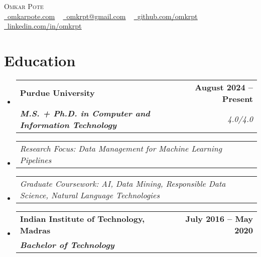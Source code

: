 \documentclass[letterpaper,11pt]{article}
\makeatletter
\newcommand{\resumeSubheading}[4]{
  \vspace{-2pt}\item
    \begin{tabular*}{1.0\textwidth}[t]{l@{\extracolsep{\fill}}r}
      \textbf{#1} & \textbf{\small #2} \\
      \textit{\small#3} & \textit{\small #4} \\
    \end{tabular*}\vspace{-7pt}
}
\newcommand{\resumeSubSubheading}[2]{
    \item
    \begin{tabular*}{1.0\textwidth}{l@{\extracolsep{\fill}}r}
      \textit{\small#1} & \textit{\small #2} \\
    \end{tabular*}\vspace{-7pt}
}
\newcommand{\resumeSubHeadingListStart}{\begin{itemize}[leftmargin=0.0in, label={}]}
\newcommand{\resumeSubHeadingListEnd}{\end{itemize}}
\makeatother
\begin{document}

\begin{center}
    {\vspace*{30pt} \Huge \scshape Omkar Pote} \\ \vspace{5pt} 
    \small
    \href{https://omkarpote.com}{\raisebox{-0.2\height}\faGlobe\  \underline{omkarpote.com}} ~ 
    \href{mailto:omkrpt@gmail.com}{\raisebox{-0.2\height}\faEnvelope\  \underline{omkrpt@gmail.com}} ~
    \href{https://github.com/omkrpt}{\raisebox{-0.2\height}\faGithub\ \underline{github.com/omkrpt}} ~ 
    \href{https://linkedin.com/in/omkrpt/}{\raisebox{-0.2\height}\faLinkedin\ \underline{linkedin.com/in/omkrpt}}
    \vspace{-8pt}
\end{center}


\section{Education}
  \resumeSubHeadingListStart
    \resumeSubheading
      {Purdue University}{August 2024 -- Present}
      {\textbf{M.S. + Ph.D. in Computer and Information Technology}}{4.0/4.0}
      \vspace{-8pt}
      \resumeSubSubheading
      {Research Focus: Data Management for Machine Learning Pipelines}{}
      \vspace{-18pt}
      \resumeSubSubheading
      {Graduate Coursework: AI, Data Mining, Responsible Data Science, Natural Language Technologies}{}  
      \vspace{-8pt}
    \resumeSubheading
      {Indian Institute of Technology, Madras}{July 2016 -- May 2020}
      {\textbf{Bachelor of Technology}}{}
  \resumeSubHeadingListEnd

\end{document}
